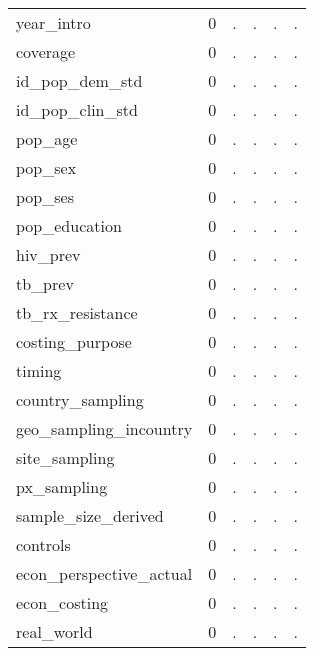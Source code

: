 \begin{table}[htbp]
\begin{tabular}{l*{1}{ccccc}}
year\_intro  &           0&           .&           .&           .&           .\\
coverage    &           0&           .&           .&           .&           .\\
id\_pop\_dem\_std&           0&           .&           .&           .&           .\\
id\_pop\_clin\_std&           0&           .&           .&           .&           .\\
pop\_age     &           0&           .&           .&           .&           .\\
pop\_sex     &           0&           .&           .&           .&           .\\
pop\_ses     &           0&           .&           .&           .&           .\\
pop\_education&           0&           .&           .&           .&           .\\
hiv\_prev    &           0&           .&           .&           .&           .\\
tb\_prev     &           0&           .&           .&           .&           .\\
tb\_rx\_resistance&           0&           .&           .&           .&           .\\
costing\_purpose&           0&           .&           .&           .&           .\\
timing      &           0&           .&           .&           .&           .\\
country\_sampling&           0&           .&           .&           .&           .\\
geo\_sampling\_incountry&           0&           .&           .&           .&           .\\
site\_sampling&           0&           .&           .&           .&           .\\
px\_sampling &           0&           .&           .&           .&           .\\
sample\_size\_derived&           0&           .&           .&           .&           .\\
controls    &           0&           .&           .&           .&           .\\
econ\_perspective\_actual&           0&           .&           .&           .&           .\\
econ\_costing&           0&           .&           .&           .&           .\\
real\_world  &           0&           .&           .&           .&           .\\

\end{tabular}
\end{table}
